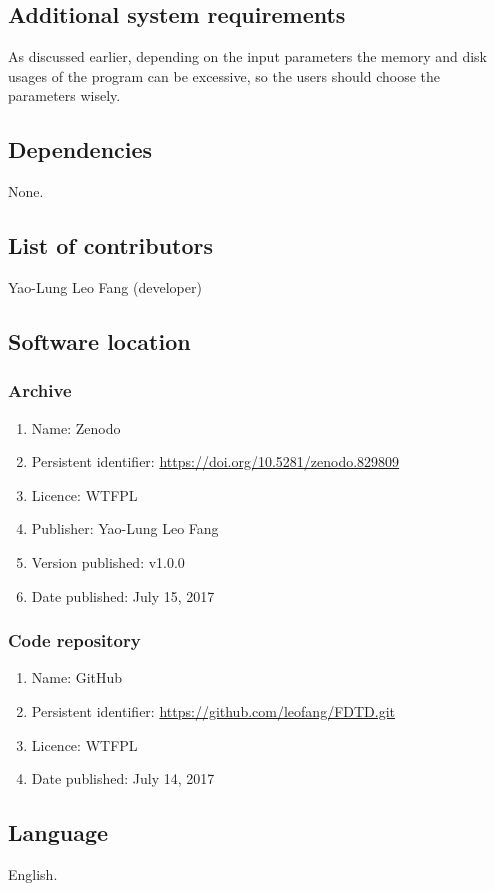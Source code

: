 \documentclass[12pt,letter,onecolumn,notitlepage]{article}
\begin{document}
\subsection{Additional system requirements}
As discussed earlier, depending on the input parameters the memory and disk usages of the program can be excessive, so the users should choose the parameters wisely.

\subsection{Dependencies}
None.

\subsection{List of contributors}
Yao-Lung Leo Fang (developer)

\subsection{Software location}
\subsubsection{Archive}
\begin{enumerate}
	\item Name: Zenodo
	\item Persistent identifier: \url{https://doi.org/10.5281/zenodo.829809}
	\item Licence: WTFPL
	\item Publisher: Yao-Lung Leo Fang
	\item Version published: v1.0.0
	\item Date published: July 15, 2017
\end{enumerate}

\subsubsection{Code repository}
\begin{enumerate}
	\item Name: GitHub
	\item Persistent identifier: \url{https://github.com/leofang/FDTD.git}
	\item Licence: WTFPL
	\item Date published: July 14, 2017
\end{enumerate}

\subsection{Language}
English.
\end{document}
